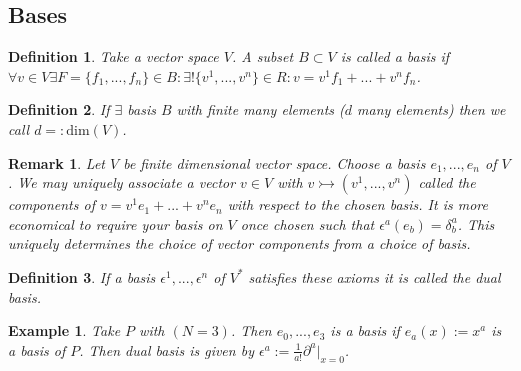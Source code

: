 \documentclass[10pt, oneside]{article}
\newtheorem{defn}{Definition}
\newtheorem{example}{Example}
\newtheorem{remark}{Remark}
\begin{document}
     \subsection*{Bases}
        \begin{defn}
           Take a vector space $V$. A subset $B \subset V$ is called a basis if $\forall v \in V \exists F=\{f_1, ..., f_n\} \in B : \exists ! \{v^1, ..., v^n\} \in R : v = v^1 f_1 + ... + v^n f_n$.
        \end{defn}
        \begin{defn}
           If $\exists$ basis $B$ with finite many elements ($d$ many elements) then we call $d =: \text{dim}(V)$.
        \end{defn}
        \begin{remark}
           Let $V$ be finite dimensional vector space. Choose a basis $e_1, ..., e_n$ of $V$. We may uniquely associate a vector $v \in V$ with $v \rightarrowtail (v^1,...,v^n)$ called the components of $v=v^1e_1+...+v^ne_n$ with respect to the chosen basis.
           It is more economical to require your basis on $V$ once chosen such that $\epsilon^a (e_b) = \delta^a_b$. This uniquely determines the choice of vector components from a choice of basis.
        \end{remark}
        \begin{defn}
           If a basis $\epsilon^1,...,\epsilon^n$ of $V^*$ satisfies these axioms it is called the dual basis.
        \end{defn}
        \begin{example}
           Take $P$ with $(N=3)$. Then $e_0,...,e_3$ is a basis if $e_a (x) := x^a$ is a basis of $P$. Then dual basis is given by $\epsilon^a := \frac{1}{a!} \partial^a |_{x=0}$.
        \end{example}
\end{document}
